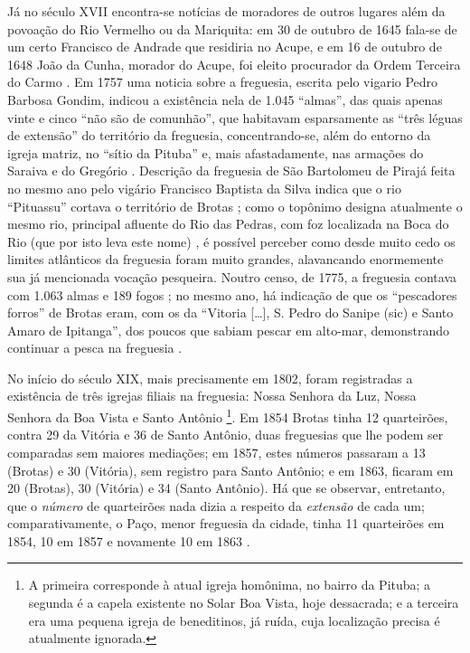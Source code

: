 Já no século XVII encontra-se notícias de moradores de outros lugares além da povoação do Rio Vermelho ou da Mariquita: em 30 de outubro de 1645 fala-se de um certo Francisco de Andrade que residiria no Acupe, e em 16 de outubro de 1648 João da Cunha, morador do Acupe, foi eleito procurador da Ordem Terceira do Carmo \cite[p.~21]{ott_formaet2_1957}. Em 1757 uma noticia sobre a freguesia, escrita pelo vigario Pedro Barbosa Gondim, indicou a existência nela de 1.045 ``almas'', das quais apenas vinte e cinco ``não são de comunhão'', que habitavam esparsamente as ``três léguas de extensão'' do território da freguesia, concentrando-se, além do entorno da igreja matriz, no ``sítio da Pituba'' e, mais afastadamente, nas armações do Saraiva e do Gregório \cite[p.~183]{castralmeida_ultramar_1908}. Descrição da freguesia de São Bartolomeu de Pirajá feita no mesmo ano pelo vigário Francisco Baptista da Silva indica que o rio ``Pituassu'' cortava o território de Brotas \cite[p.~218]{castralmeida_ultramar_1908}; como o topônimo designa atualmente o mesmo rio, principal afluente do Rio das Pedras, com foz localizada na Boca do Rio (que por isto leva este nome) \cite[p.~175-177]{santos_aguas_2010}, é possível perceber como desde muito cedo os limites atlânticos da freguesia foram muito grandes, alavancando enormemente sua já mencionada vocação pesqueira. Noutro censo, de 1775, a freguesia contava com 1.063 almas e 189 fogos \cite[p.~183]{castralmeida_ultramar_1910}; no mesmo ano, há indicação de que os ``pescadores forros'' de Brotas eram, com os da ``Vitoria [\dots], S. Pedro do Sanipe (sic) e Santo Amaro de Ipitanga'', dos poucos que sabiam pescar em alto-mar, demonstrando continuar a pesca na freguesia \cite[p.~294]{castralmeida_ultramar_1910}.

No início do século XIX, mais precisamente em 1802, foram registradas a existência de três igrejas filiais na freguesia: Nossa Senhora da Luz, Nossa Senhora da Boa Vista e Santo Antônio \cite[p.~172]{VASCONCELOS2002}\footnote{A primeira corresponde à atual igreja homônima, no bairro da Pituba; a segunda é a capela existente no Solar Boa Vista, hoje dessacrada; e a terceira era uma pequena igreja de beneditinos, já ruída, cuja localização precisa é atualmente ignorada.}. Em 1854 Brotas tinha 12 quarteirões, contra 29 da Vitória e 36 de Santo Antônio, duas freguesias que lhe podem ser comparadas sem maiores mediações; em 1857, estes números passaram a 13 (Brotas) e 30 (Vitória), sem registro para Santo Antônio; e em 1863, ficaram em 20 (Brotas), 30 (Vitória) e 34 (Santo Antônio). Há que se observar, entretanto, que o \textit{número} de quarteirões nada dizia a respeito da \textit{extensão} de cada um; comparativamente, o Paço, menor freguesia da cidade, tinha 11 quarteirões em 1854, 10 em 1857 e novamente 10 em 1863 \cite[p.~46]{NASCIMENTO2007}.

